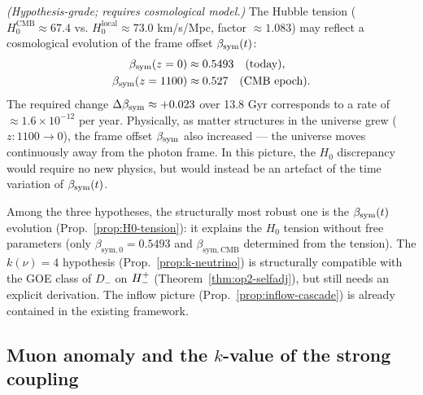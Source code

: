 \begin{proposition}
\label{prop:H0-tension}
\emph{(Hypothesis-grade; requires cosmological model.)}
The Hubble tension ($H_0^{\mathrm{CMB}} \approx 67.4$ vs.
$H_0^{\mathrm{local}} \approx 73.0$ km/s/Mpc, factor $\approx 1.083$)
may reflect a cosmological evolution of the frame offset $\beta_{\mathrm{sym}}(t)$:
\begin{align*}
  \beta_{\mathrm{sym}}(z=0) &\approx 0.5493 \quad \text{(today)}, \\
  \beta_{\mathrm{sym}}(z=1100) &\approx 0.527 \quad \text{(CMB epoch)}.
\end{align*}
The required change $\Delta\beta_{\mathrm{sym}} \approx +0.023$ over 13.8 Gyr
corresponds to a rate of $\approx 1.6\times 10^{-12}$ per year.
Physically, as matter structures in the universe grew ($z: 1100\to 0$),
the frame offset $\beta_{\mathrm{sym}}$ also increased --- the universe moves
continuously away from the photon frame.
In this picture, the $H_0$ discrepancy would require no new physics,
but would instead be an artefact of the time variation of $\beta_{\mathrm{sym}}(t)$.
\end{proposition}

\begin{remark}
\label{rem:inflow-evaluation}
Among the three hypotheses, the structurally most robust one is the
$\beta_{\mathrm{sym}}(t)$ evolution (Prop.~\ref{prop:H0-tension}): it explains the
$H_0$ tension without free parameters (only
$\beta_{\mathrm{sym},0} = 0.5493$ and
$\beta_{\mathrm{sym},\mathrm{CMB}}$ determined from the tension).
The $k(\nu) = 4$ hypothesis (Prop.~\ref{prop:k-neutrino}) is
structurally compatible with the GOE class of $D_-$ on $H^+_-$
(Theorem~\ref{thm:op2-selfadj}), but still needs an explicit derivation.
The inflow picture (Prop.~\ref{prop:inflow-cascade}) is already contained
in the existing framework.
\end{remark}

\subsection{Muon anomaly and the $k$-value of the strong coupling}
\label{sec:muon-anomaly}

